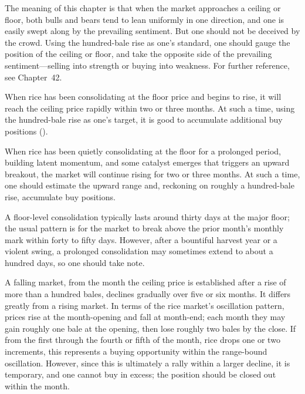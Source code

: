 \commentary
The meaning of this chapter is that when the market approaches a ceiling
or floor, both bulls and bears tend to lean uniformly in one direction,
and one is easily swept along by the prevailing sentiment. But one
should not be deceived by the crowd. Using the hundred-bale rise as
one's standard, one should gauge the position of the ceiling or floor,
and take the opposite side of the prevailing sentiment---selling into
strength or buying into weakness. For further reference, see Chapter~42.


\begin{sokyubox}
{\small\itshape\color{sokyubar} }

\medskip
When rice has been consolidating at the floor price and begins to rise,
it will reach the ceiling price rapidly within two or three months. At
such a time, using the hundred-bale rise as one's target, it is good to
accumulate additional buy positions ().
\end{sokyubox}

\commentary
When rice has been quietly consolidating at the floor for a prolonged
period, building latent momentum, and some catalyst emerges that triggers
an upward breakout, the market will continue rising for two or three
months. At such a time, one should estimate the upward range and,
reckoning on roughly a hundred-bale rise, accumulate buy positions.

A floor-level consolidation typically lasts around thirty days at the
major floor; the usual pattern is for the market to break above the
prior month's monthly mark within forty to fifty days. However, after a
bountiful harvest year or a violent swing, a prolonged consolidation may
sometimes extend to about a hundred days, so one should take note.


\begin{sokyubox}
{\small\itshape\color{sokyubar} }

\medskip
A falling market, from the month the ceiling price is established after
a rise of more than a hundred bales, declines gradually over five or six
months. It differs greatly from a rising market. In terms of the rice
market's oscillation pattern, prices rise at the month-opening and fall
at month-end; each month they may gain roughly one bale at the opening,
then lose roughly two bales by the close. If from the first through the
fourth or fifth of the month, rice drops one or two increments, this
represents a buying opportunity within the range-bound oscillation.
However, since this is ultimately a rally within a larger decline, it is
temporary, and one cannot buy in excess; the position should be closed
out within the month.
\end{sokyubox}

